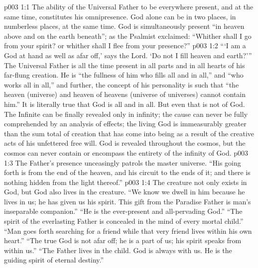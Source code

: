 \vs p003 1:1 The ability of the Universal Father to be everywhere present, and at the same time, constitutes his omnipresence. God alone can be in two places, in numberless places, at the same time. God is simultaneously present “in heaven above and on the earth beneath”; as the Psalmist exclaimed: “Whither shall I go from your spirit? or whither shall I flee from your presence?”
\vs p003 1:2 “‘I am a God at hand as well as afar off,’ says the Lord. ‘Do not I fill heaven and earth?’” The Universal Father is all the time present in all parts and in all hearts of his far\hyp{}flung creation. He is “the fullness of him who fills all and in all,” and “who works all in all,” and further, the concept of his personality is such that “the heaven (universe) and heaven of heavens (universe of universes) cannot contain him.” It is literally true that God is all and in all. But even that is not  of God. The Infinite can be finally revealed only in infinity; the cause can never be fully comprehended by an analysis of effects; the living God is immeasurably greater than the sum total of creation that has come into being as a result of the creative acts of his unfettered free will. God is revealed throughout the cosmos, but the cosmos can never contain or encompass the entirety of the infinity of God.
\vs p003 1:3 The Father’s presence unceasingly patrols the master universe. “His going forth is from the end of the heaven, and his circuit to the ends of it; and there is nothing hidden from the light thereof.”
\vs p003 1:4 \pc The creature not only exists in God, but God also lives in the creature. “We know we dwell in him because he lives in us; he has given us his spirit. This gift from the Paradise Father is man’s inseparable companion.” “He is the ever\hyp{}present and all\hyp{}pervading God.” “The spirit of the everlasting Father is concealed in the mind of every mortal child.” “Man goes forth searching for a friend while that very friend lives within his own heart.” “The true God is not afar off; he is a part of us; his spirit speaks from within us.” “The Father lives in the child. God is always with us. He is the guiding spirit of eternal destiny.”
